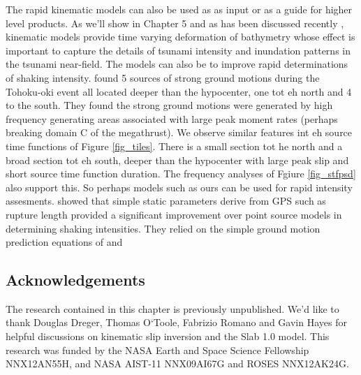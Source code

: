 The rapid kinematic models can also be used as as input or as a guide for higher level products. As we'll show in Chapter 5 and as has been discussed recently \citep{satake2013}, kinematic models provide time varying deformation of bathymetry whose effect is important to capture the details of tsunami intensity and inundation patterns in the tsunami near-field. The models can also be to improve rapid determinations of shaking intensity. \citet{kurahashi2011} found 5 sources of strong ground motions during the Tohoku-oki event all located deeper than the hypocenter, one tot eh north and 4 to the south. They found the strong ground motions were generated by high frequency generating areas associated with large peak moment rates (perhaps breaking domain C of the megathrust). We observe similar features int eh source time functions of Figure \ref{fig_tiles}. There is a small section tot he north and a broad section tot eh south, deeper than the hypocenter with large peak slip and short source time function duration. The frequency analyses of Fgiure \ref{fig_stfpsd} also support this. So perhaps models such as ours can be used for rapid intensity assesments. \citet{colombelli2013} showed that simple static parameters derive from GPS such as rupture length provided a significant improvement over point source models in determining shaking intensities. They relied on the simple ground motion prediction equations of \citet{boore1997} and \citet{si2000}

\subsection{Acknowledgements}

The research contained in this chapter is previously unpublished. We'd like to thank Douglas Dreger, Thomas O`Toole, Fabrizio Romano and Gavin Hayes for helpful discussions on kinematic slip inversion and the Slab 1.0 model. This research was funded by the NASA Earth and Space Science Fellowship NNX12AN55H, and NASA AIST-11 NNX09AI67G and ROSES NNX12AK24G.

